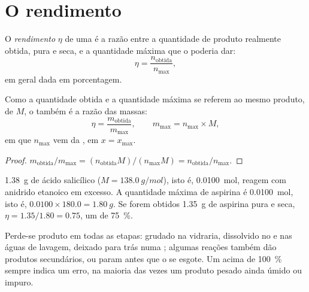 \section{O rendimento}

\begin{definition}[Rendimento]\label{def:g10:synthesis-yield:yield}
O \emph{rendimento} $\eta$ de uma  é a razão
entre a quantidade de produto realmente obtida, pura e seca, e a
quantidade máxima que o  poderia dar:
\[
  \eta = \frac{n_{\text{obtida}}}{n_{\max}} ,
\]
em geral dada em porcentagem.
\end{definition}

\begin{proposition}\label{prop:g10:synthesis-yield:masses}
Como a quantidade obtida e a quantidade máxima se referem ao mesmo
produto, de  $M$, o  também é a razão das massas:
\[
  \eta = \frac{m_{\text{obtida}}}{m_{\max}},
  \qquad m_{\max} = n_{\max} \times M,
\]
em que $n_{\max}$ vem da , em $x = x_{\max}$.
\end{proposition}

\begin{proof}
$m_{\text{obtida}} / m_{\max} = (n_{\text{obtida}} M) / (n_{\max} M)
= n_{\text{obtida}} / n_{\max}$.
\end{proof}

\begin{example}\label{ex:g10:synthesis-yield:small}
\qty{1.38}{g} de ácido salicílico ($M = \qty{138.0}{g/mol}$), isto é,
\qty{0.0100}{mol}, reagem com anidrido etanoico em excesso. A quantidade
máxima de aspirina é \qty{0.0100}{mol}, isto é,
$0.0100 \times 180.0 = \qty{1.80}{g}$. Se forem obtidos \qty{1.35}{g} de
aspirina pura e seca, $\eta = 1.35 / 1.80 = 0.75$, um  de
\qty{75}{\percent}.
\end{example}

\begin{remark}\label{rem:g10:synthesis-yield:below}
Perde-se produto em todas as etapas: grudado na vidraria, dissolvido no
 e nas águas de lavagem, deixado para trás numa ;
algumas reações também dão produtos secundários, ou param antes que o
 se esgote. Um  acima de \qty{100}{\percent}
sempre indica um erro, na maioria das vezes um produto pesado ainda
úmido ou impuro.
\end{remark}

